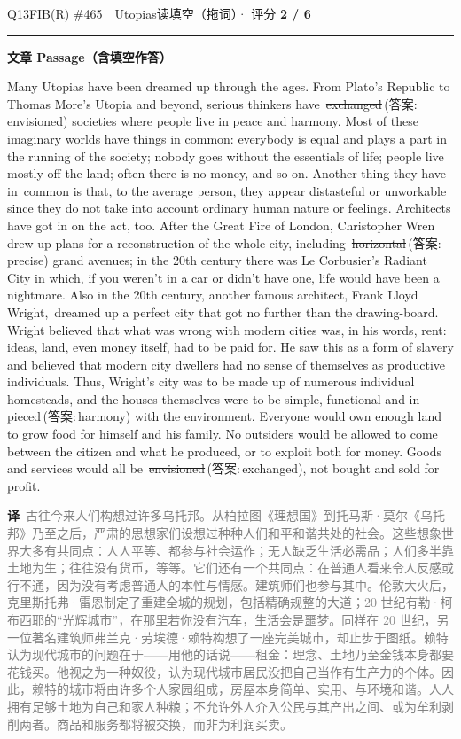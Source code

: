 \documentclass[11pt]{article}
\newcommand{\ptesub}[1]{%
  \par\needspace{2\baselineskip}\smallskip
  {\color{cAccent}\rule[-0.2ex]{3pt}{1.05em}}\hspace{6pt}%
  {\bfseries\color{cHead}#1}\par\nopagebreak\smallskip}
\newcommand{\zh}[1]{{\footnotesize\textcolor{cNote}{\textbf{译}}\ \textcolor{gray}{#1}}}
\newcommand{\rok}[1]{{\color{cFix}\ding{51}\,#1}}                 %
\newcommand{\rno}[2]{{\color{cWrong}\ding{55}\,\sout{#1}}\,{\footnotesize\color{cFix}(答案:\,#2)}}  %
\begin{document}
\begin{qblock}{Q13\quad FIB(R) \#465\ \ Utopias}{读填空（拖词）· 评分 \textcolor{cAccent}{\bfseries 2 / 6}}
\ptesub{文章 Passage（含填空作答）}
\begin{promptbox}
Many Utopias have been dreamed up through the ages. From Plato's Republic to Thomas More's Utopia and beyond, serious thinkers have \rno{exchanged}{envisioned} societies where people live in peace and harmony. Most of these imaginary worlds have things in common: everybody is equal and plays a part in the running of the society; nobody goes without the essentials of life; people live mostly off the land; often there is no money, and so on. Another thing they have in \rok{common} is that, to the average person, they appear distasteful or unworkable since they do not take into account ordinary human nature or feelings. Architects have got in on the act, too. After the Great Fire of London, Christopher Wren drew up plans for a reconstruction of the whole city, including \rno{horizontal}{precise} grand avenues; in the 20th century there was Le Corbusier's Radiant City in which, if you weren't in a car or didn't have one, life would have been a nightmare. Also in the 20th century, another famous architect, Frank Lloyd Wright, \rok{dreamed} up a perfect city that got no further than the drawing-board. Wright believed that what was wrong with modern cities was, in his words, rent: ideas, land, even money itself, had to be paid for. He saw this as a form of slavery and believed that modern city dwellers had no sense of themselves as productive individuals. Thus, Wright's city was to be made up of numerous individual homesteads, and the houses themselves were to be simple, functional and in \rno{pieced}{harmony} with the environment. Everyone would own enough land to grow food for himself and his family. No outsiders would be allowed to come between the citizen and what he produced, or to exploit both for money. Goods and services would all be \rno{envisioned}{exchanged}, not bought and sold for profit.
\end{promptbox}
\zh{古往今来人们构想过许多乌托邦。从柏拉图《理想国》到托马斯·莫尔《乌托邦》乃至之后，严肃的思想家们设想过种种人们和平和谐共处的社会。这些想象世界大多有共同点：人人平等、都参与社会运作；无人缺乏生活必需品；人们多半靠土地为生；往往没有货币，等等。它们还有一个共同点：在普通人看来令人反感或行不通，因为没有考虑普通人的本性与情感。建筑师们也参与其中。伦敦大火后，克里斯托弗·雷恩制定了重建全城的规划，包括精确规整的大道；20 世纪有勒·柯布西耶的“光辉城市”，在那里若你没有汽车，生活会是噩梦。同样在 20 世纪，另一位著名建筑师弗兰克·劳埃德·赖特构想了一座完美城市，却止步于图纸。赖特认为现代城市的问题在于——用他的话说——租金：理念、土地乃至金钱本身都要花钱买。他视之为一种奴役，认为现代城市居民没把自己当作有生产力的个体。因此，赖特的城市将由许多个人家园组成，房屋本身简单、实用、与环境和谐。人人拥有足够土地为自己和家人种粮；不允许外人介入公民与其产出之间、或为牟利剥削两者。商品和服务都将被交换，而非为利润买卖。}

\end{qblock}
\end{document}
